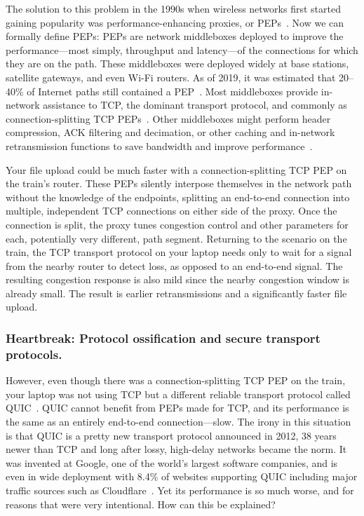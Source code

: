 The solution to this problem in the 1990s when wireless networks first started
gaining popularity was performance-enhancing proxies, or PEPs~\cite{rfc3135}.
Now we can formally
define PEPs: PEPs are network middleboxes deployed to improve the
performance---most simply, throughput and latency---of the connections for
which they are on the path. These middleboxes were deployed widely at base
stations, satellite gateways, and even Wi-Fi routers. As of 2019, it was
estimated that 20--40\% of Internet paths still contained a
PEP~\cite{imc2011handley, edeline2019bottomup}. Most
middleboxes provide in-network assistance to TCP, the dominant transport
protocol, and commonly as connection-splitting TCP PEPs~\cite
{kapoor2005achieving,caini2006pepsal,davern2011httpep,farkas2012splittcp,hayes2019mmwave}.
Other middleboxes
might perform header compression, ACK filtering and decimation, or other
caching and in-network retransmission functions to save bandwidth and improve
performance~\cite
{balakrishnan1995snoop,polese2017milliproxy,cronkite2016vcc,he2016acdc,mihaly2012mobilePEP}.

Your file upload could be much faster with a connection-splitting TCP PEP on the
train's router. These PEPs silently interpose themselves in the network path
without the knowledge of the endpoints, splitting
an end-to-end connection into multiple, independent TCP connections on either
side of the proxy. Once the connection is split, the proxy tunes congestion
control and other parameters for each, potentially very different, path
segment. Returning to the scenario on the train, the TCP transport protocol on
your laptop needs only to wait for a signal from the nearby router to detect
loss, as opposed to an end-to-end signal. The resulting congestion response is
also mild since the nearby congestion window is already small. The result is
earlier retransmissions and a significantly faster file upload.

\subsubsection{Heartbreak: Protocol ossification and secure transport protocols.}

However, even though there was a connection-splitting TCP PEP on the train, your
laptop was not using TCP but a different reliable transport protocol called
QUIC~\cite{rfc9000}. QUIC cannot benefit from PEPs made for TCP, and its
performance is the
same as an entirely end-to-end connection---slow. The irony in this situation
is that QUIC is a pretty new transport protocol announced in 2012, 38 years
newer than TCP and long after lossy, high-delay networks became the norm. It
was invented at Google, one of the world's largest software companies, and is
even in wide deployment with 8.4\% of websites supporting QUIC including major
traffic sources such as Cloudflare~\cite{zirngibl2021quicdeployment,w3techs,quiche}.
Yet its performance is so much worse, and
for reasons that were very intentional. How can this be explained?

